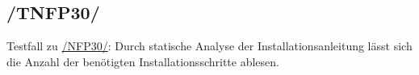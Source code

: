 \subsection*{/TNFP30/}

\label{/TNFP30/} Testfall zu \hyperref[/NFP30/]{/NFP30/}: Durch \gls{statische Analyse} der Installationsanleitung lässt sich die Anzahl der benötigten Installationsschritte ablesen.